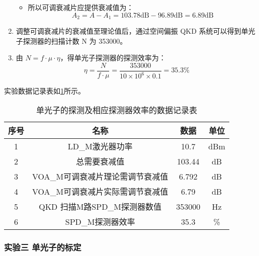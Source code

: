 \documentclass[dvipsnames, svgnames,a4paper,11pt]{article}
\begin{document}
\begin{enumerate}
\begin{itemize}
					\item 所以可调衰减片应提供衰减值为：
						$$ A_2 = A - A_1 = 103.78 \mathrm{dB} - 96.89 \mathrm{dB} = 6.89 \mathrm{dB} $$

				\end{itemize}
			
			\item 调整可调衰减片的衰减值至理论值后，通过空间偏振 QKD 系统可以得到单光子探测器的扫描计数 N 为 353000。
			
			\item 由 $ N = f \cdot \mu \cdot \eta $，得单光子探测器的探测效率为：
				$$ \eta = \frac{N}{f \cdot \mu} = \frac{353000}{10 \times 10^{6} \times 0.1} = 35.3 \% $$

		\end{enumerate}

		实验数据记录表如\cref{tbl:D3-2-1}所示。

		\begin{table}[htbp]
			\centering
			\begin{tabular}{|c|c|cc|} 
			\hline
			序号 & 名称                  & 数据     & 单位   \\ 
			\hline
			1  & LD\_M激光器功率          & 10.7   & dBm  \\
			2  & 总需要衰减值              & 103.44 & dB   \\
			3  & VOA\_M可调衰减片理论需调节衰减值 & 6.792  & dB   \\
			4  & VOA\_M可调衰减片实际需调节衰减值 & 6.79   & dB   \\
			5  & QKD 扫描M路SPD\_M探测器数值 & 353000 & Hz   \\
			6  & SPD\_M探测器效率         & 35.3   & \%   \\
			\hline
			\end{tabular}
			\caption{单光子的探测及相应探测器效率的数据记录表}
			\label{tbl:D3-2-1}
		\end{table}
		

	\subsubsection{实验三 \quad 单光子的标定}
	\label{subsection2.1.3}
\end{document}
